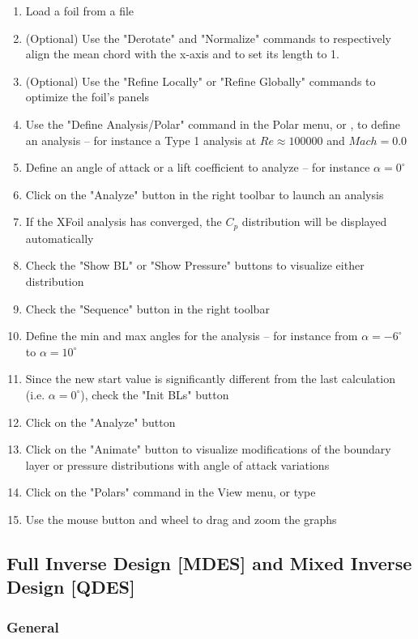 \documentclass[a4paper,twoside,12pt,dvips]{article}
\begin{document}
\begin{enumerate}
\item Load a foil from a file
\item (Optional) Use the "Derotate" and "Normalize" commands to
  respectively align the mean chord with the x-axis and to set its
  length to 1.
\item (Optional) Use the "Refine Locally" or "Refine Globally"
  commands to optimize the foil's panels
\item Use the "Define Analysis/Polar" command in the Polar menu, or
  , to define an analysis -- for instance a Type 1 analysis at
  $Re \approx 100000$ and $Mach = 0.0$
\item Define an angle of attack or a lift coefficient to analyze --
  for instance $\alpha = 0^\circ$
\item Click on the "Analyze" button in the right toolbar to launch an
  analysis
\item If the XFoil analysis has converged, the $C_p$ distribution will be
  displayed automatically
\item Check the "Show BL" or "Show Pressure" buttons to visualize either
  distribution
\item Check the "Sequence" button in the right toolbar
\item Define the min and max angles for the analysis -- for instance
  from $\alpha = -6^\circ$ to $\alpha = 10^\circ$
\item Since the new start value is significantly different from the
  last calculation (i.e. $\alpha = 0^\circ$), check
  the "Init BLs" button
\item Click on the "Analyze" button
\item Click on the "Animate" button to visualize modifications of the
  boundary layer or pressure distributions with angle of attack
  variations
\item Click on the "Polars" command in the View menu, or type 
\item Use the mouse button and wheel to drag and zoom the graphs
\end{enumerate}

\subsection{Full Inverse Design [MDES] and Mixed Inverse Design [QDES]}

\subsubsection{General}
\end{document}
